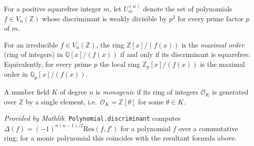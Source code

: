 \begin{definition}
  \label{def:U_m_weak}
  For a positive squarefree integer \(m\), let \(U_m^{(w)}\) denote
  the set of polynomials \(f\in V_n(\mathbb{Z})\) whose discriminant
  is weakly divisible by \(p^2\) for every prime factor \(p\) of \(m\).
\end{definition}


\begin{definition}
  \label{def:maximal_order}
  For an irreducible \(f\in V_n(\mathbb{Z})\), the ring
  \(\mathbb{Z}[x]/(f(x))\) is the \emph{maximal order} (ring of
  integers) in \(\mathbb{Q}[x]/(f(x))\) if and only if its
  discriminant is squarefree.  Equivalently, for every prime \(p\) the
  local ring \(\mathbb{Z}_p[x]/(f(x))\) is the maximal order in
  \(\mathbb{Q}_p[x]/(f(x))\).
\end{definition}

\begin{definition}
  \label{def:monogenic_field}
  A number field \(K\) of degree \(n\) is \emph{monogenic} if its
  ring of integers \(\mathcal{O}_K\) is generated over \(\mathbb{Z}\)
  by a single element, i.e.\ \(\mathcal{O}_K=\mathbb{Z}[\theta]\)
  for some \(\theta\in K\).
\end{definition}


\begin{lemma}
  \label{lem:disc_mathlib}
  \mathlibok
  \textit{Provided by Mathlib.}
  \texttt{Polynomial.discriminant} computes \(\Delta(f)=(-1)^{n(n-1)/2}\mathrm{Res}(f,f')\)
  for a polynomial \(f\) over a commutative ring; for a monic
  polynomial this coincides with the resultant formula above.
\end{lemma}


